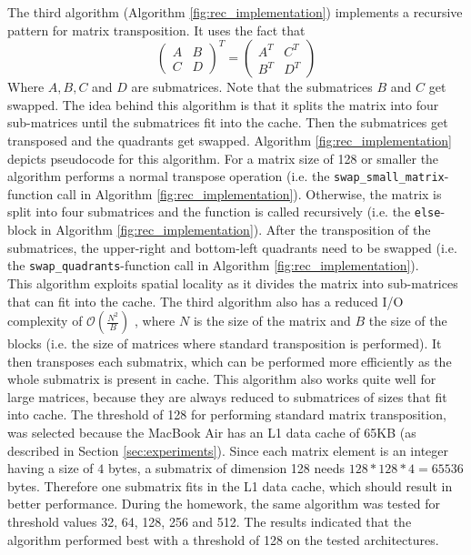 \documentclass[conference]{IEEEtran}
\begin{document}
    The third algorithm (Algorithm \ref{fig:rec_implementation}) implements a recursive pattern for matrix transposition. It uses the fact that 
    \begin{equation*}
        \begin{pmatrix}
            A & B \\
            C & D
        \end{pmatrix}^T = 
        \begin{pmatrix}
            A^T & C^T \\
            B^T & D^T
        \end{pmatrix}
    \end{equation*}
    Where $A, B, C$ and $D$ are submatrices. Note that the submatrices $B$ and $C$ get swapped. The idea behind this algorithm is that it splits the matrix into four sub-matrices until the submatrices fit into the cache. Then the submatrices get transposed and the quadrants get swapped. Algorithm \ref{fig:rec_implementation} depicts pseudocode for this algorithm. For a matrix size of 128 or smaller the algorithm performs a normal transpose operation (i.e. the \lstinline{swap_small_matrix}-function call in Algorithm \ref{fig:rec_implementation}). Otherwise, the matrix is split into four submatrices and the function is called recursively (i.e. the \lstinline{else}-block in Algorithm \ref{fig:rec_implementation}). After the transposition of the submatrices, the upper-right and bottom-left quadrants need to be swapped (i.e. the \lstinline{swap_quadrants}-function call in Algorithm \ref{fig:rec_implementation}).\\
    This algorithm exploits spatial locality as it divides the matrix into sub-matrices that can fit into the cache. The third algorithm also has a reduced I/O complexity of $\mathcal{O}(\frac{N^2}{B})$ \cite{algorithmica}, where $N$ is the size of the matrix and $B$ the size of the blocks (i.e. the size of matrices where standard transposition is performed). It then transposes each submatrix, which can be performed more efficiently as the whole submatrix is present in cache. This algorithm also works quite well for large matrices, because they are always reduced to submatrices of sizes that fit into cache. The threshold of 128 for performing standard matrix transposition, was selected because the MacBook Air has an L1 data cache of 65KB (as described in Section \ref{sec:experiments}). Since each matrix element is an integer having a size of $4$ bytes, a submatrix of dimension 128 needs $128*128*4 = 65536$ bytes. Therefore one submatrix fits in the L1 data cache, which should result in better performance. During the homework, the same algorithm was tested for threshold values 32, 64, 128, 256 and 512. The results indicated that the algorithm performed best with a threshold of 128 on the tested architectures.
\end{document}
